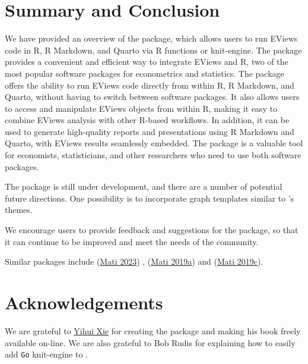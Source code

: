 \hypertarget{sec-conclusion}{%
\section{Summary and Conclusion}\label{sec-conclusion}}

We have provided an overview of the  package, which allows users to run EViews code in R, R Markdown, and Quarto via R functions or knit-engine. The package provides a convenient and efficient way to integrate EViews and R, two of the most popular software packages for econometrics and statistics. The package offers the ability to run EViews code directly from within R, R Markdown, and Quarto, without having to switch between software packages. It also allows users to access and manipulate EViews objects from within R, making it easy to combine EViews analysis with other R-based workflows. In addition, it can be used to generate high-quality reports and presentations using R Markdown and Quarto, with EViews results seamlessly embedded. The package is a valuable tool for economists, statisticians, and other researchers who need to use both software packages.

The  package is still under development, and there are a number of potential future directions. One possibility is to incorporate graph templates similar to 's themes.

We encourage users to provide feedback and suggestions for the  package, so that it can continue to be improved and meet the needs of the community.

Similar packages include  (\protect\hyperlink{ref-Mati2023a}{Mati 2023}) ,  (\protect\hyperlink{ref-Mati2019a}{Mati 2019a}) and  (\protect\hyperlink{ref-Mati2019b}{Mati 2019c}).

\hypertarget{acknowledgements}{%
\section*{Acknowledgements}\label{acknowledgements}}

We are grateful to \href{https://yihui.name/}{Yihui Xie} for creating the  package and making his book freely available on-line. We are also grateful to Bob Rudis for explaining how to easily add \texttt{Go} knit-engine to .



